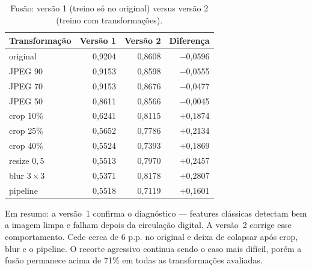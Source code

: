 \documentclass[12pt]{article}
\begin{document}
\begin{table}[ht]
\centering
\caption{Fusão: versão 1 (treino só no original) versus versão 2 (treino com transformações).}
\label{tab:cmp-fusao}
\begin{tabular}{lrrr}
\hline
Transformação & Versão 1 & Versão 2 & Diferença \\
\hline
original     & 0,9204 & 0,8608 & $-$0,0596 \\
JPEG 90      & 0,9153 & 0,8598 & $-$0,0555 \\
JPEG 70      & 0,9153 & 0,8676 & $-$0,0477 \\
JPEG 50      & 0,8611 & 0,8566 & $-$0,0045 \\
crop 10\%    & 0,6241 & 0,8115 & $+$0,1874 \\
crop 25\%    & 0,5652 & 0,7786 & $+$0,2134 \\
crop 40\%    & 0,5524 & 0,7393 & $+$0,1869 \\
resize $0{,}5$ & 0,5513 & 0,7970 & $+$0,2457 \\
blur $3{\times}3$ & 0,5371 & 0,8178 & $+$0,2807 \\
pipeline     & 0,5518 & 0,7119 & $+$0,1601 \\
\hline
\end{tabular}
\end{table}

Em resumo: a versão~1 confirma o diagnóstico --- features clássicas detectam bem a imagem limpa e falham depois da circulação digital. A versão~2 corrige esse comportamento. Cede cerca de 6 p.p. no original e deixa de colapsar após crop, blur e o pipeline. O recorte agressivo continua sendo o caso mais difícil, porém a fusão permanece acima de 71\% em todas as transformações avaliadas.



\end{document}
